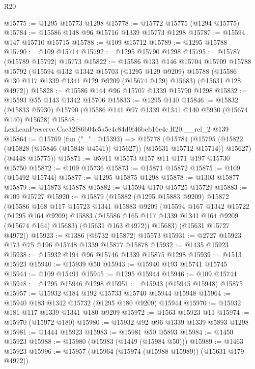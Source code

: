 \begin{lexlean}{R20}
\begin{coremodule}
@15775 := @1295 @15773 @1298
@15778 := @15772 @15775 (@1294 @15775)
@15784 := @15586 @148 @96 @15716 @1339 @15773 @1298
@15787 := @15594 @147 @15710 @15715
@15788 := @109 @15712
@15789 := @1295 @15788
@15790 := @109 @15714
@15792 := @1295 @15790 @1298
@15795 := @15787 (@15789 @15792) @15773
@15822 := @15586
    @133
    @146
    @15704
    @15709
    @15788
    @15792
    (@15594
      @132
      @1342
      @15703
      (@1295 @129 @9209)
      @15788
      (@15586 @130 @117 @1339 @1341 @129 @9209 (@15674 @129) @15683)
      (@15631 @128 @4972))
@15828 := @15586 @144 @96 @15707 @1339 @15790 @1298
@15832 := @15593 @55 @143 @1342 @15706
@15833 := @1295 @140
@15846 := @15832 (@15833 @5930) @15790 (@15586 @141 @97 @1339 @1341 @140 @5930 (@15674 @140) @15628)
@15848 := LexLeanPreserve.Cac32f86b04c5a5e4c84d9f46beb16e4c.R20.__rel_2 @139
@15864 := @15769
    (fun ("_" : @15393) =>
    @15778
      (@15784
        (@15795 (@15822 (@15828 (@15846 (@15848 @4541)) @15627)) (@15631 @15712 @15714))
        @15627)
      (@4448 @15775))
@15871 := @5911 @15573 @157 @11 @171 @197 @15730 @15750
@15872 := @109 @15736
@15873 := @15871 @15872
@15875 := @109 (@15492 @15744)
@15877 := @1295 @15875 @1298
@15878 := @1303 @15877
@15879 := @15873 @15878
@15882 := @15594 @170 @15725 @15729
@15883 := @109 @15727
@15920 := @15879
    (@15882
      (@1295 @15883 @9209)
      @15872
      (@15586
        @168
        @117
        @15723
        @1341
        @15883
        @9209
        (@15594
          @167
          @1342
          @15722
          (@1295 @164 @9209)
          @15883
          (@15586 @165 @117 @1339 @1341 @164 @9209 (@15674 @164) @15683)
          (@15631 @163 @4972))
        @15683)
      (@15631 @15727 @4972))
@15923 := @1386 (@6732 @15872) @15573
@15931 := @2727 @15923 @173 @75 @196 @15748 @1339 @15877 @15878
@15932 := @1435 @15923
@15938 := @15932 @194 @96 @15746 @1339 @15875 @1298
@15939 := @1513 @15923
@15940 := @15939 @50
@15943 := @15940 @193 @15741 @15745
@15944 := @109 @15491
@15945 := @1295 @15944
@15946 := @109 @15744
@15948 := @1295 @15946 @1298
@15951 := @15943 (@15945 @15948) @15875
@15957 := @15932 @184 @192 @15733 @15740 @15944 @15948
@15964 := @15940 @183 @1342 @15732 (@1295 @180 @9209) @15944
@15970 := @15932 @181 @117 @1339 @1341 @180 @9209
@15972 := @1563 @15923 @11
@15974 := @15970 (@15972 @180)
@15980 := @15932 @92 @96 @1339 @1339 @5893 @1298
@15981 := @1444 @15923
@15983 := @15981 @50 @5893
@15984 := @1450 @15923
@15988 := @15980 (@15983 (@1449 (@15984 @50)))
@15989 := @1463 @15923
@15996 := @15957 (@15964 (@15974 (@15988 @15989)) (@15631 @179 @4972))

\end{coremodule}
\end{lexlean}

